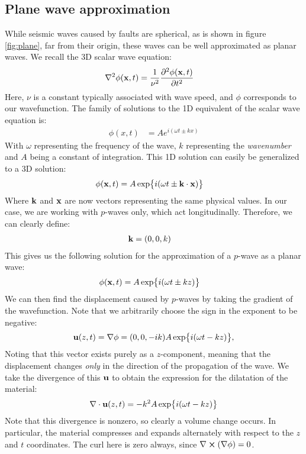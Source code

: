 \subsection{Plane wave approximation}
While seismic waves caused by faults are spherical, as is shown in figure \ref{fig:plane}, far from their origin, these waves can be well approximated as planar waves. We recall the 3D scalar wave equation:
\begin{align}
    \label{eqn:wave}
    \nabla^2 \phi(\vb{x}, t) &= \frac{1}{\nu^2}\frac{\partial ^2\phi(\vb{x}, t)}{\partial t^2}
\end{align}
Here, $\nu$ is a constant typically associated with wave speed, and $\phi$ corresponds to our wavefunction. The family of solutions to the 1D equivalent of the scalar wave equation is:
\begin{align}
    \phi(x,t) &= Ae^{i(\omega t\pm kx)}
\end{align}
With $\omega$ representing the frequency of the wave, $k$ representing the \textit{wavenumber} and $A$ being a constant of integration. This 1D solution can easily be generalized to a 3D solution:
\begin{align}
    \phi(\vb{x}, t) &= A\exp{i(\omega t \pm \vb{k}\cdot\vb{x})}
\end{align}
Where $\vb{k}$ and $\vb{x}$ are now vectors representing the same physical values. In our case, we are working with $p$-waves only, which act longitudinally. Therefore, we can clearly define:
\begin{align*}
    \vb{k} &= (0,0,k)
\end{align*}
This gives us the following solution for the approximation of a $p$-wave as a planar wave:
\begin{align}
    \phi(\vb{x}, t) &= A\exp{i(\omega t \pm kz)}
\end{align}
We can then find the displacement caused by $p$-waves by taking the gradient of the wavefunction. Note that we arbitrarily choose the sign in the exponent to be negative:
\begin{align}
    \vb{u}(z,t)=\nabla \phi = (0,0,-ik) A\exp{i(\omega t-kz)},
\end{align}
Noting that this vector exists purely as a $z$-component, meaning that the displacement changes \textit{only} in the direction of the propagation of the wave.
We take the divergence of this $\vb{u}$ to obtain the expression for the dilatation of the material:
\begin{align}
    \nabla\cdot\vb{u}(z,t) = -k^2A\exp{i(\omega t-kz)}
\end{align}
Note that this divergence is nonzero, so clearly a volume change occurs. In particular, the material compresses and expands alternately with respect to the $z$ and $t$ coordinates. The curl here is zero always, since $\nabla\cross\del{\nabla\phi}=0$. 

